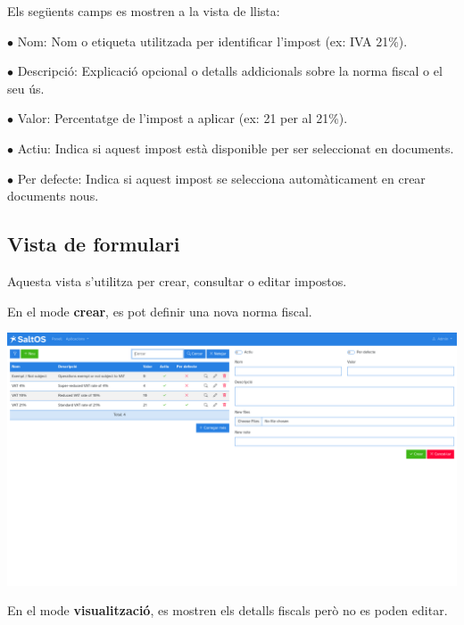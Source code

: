 \documentclass[a4paper]{article}
\begin{document}
Els següents camps es mostren a la vista de llista:

\begin{compactitem}
\item[\color{myblue}$\bullet$] Nom: Nom o etiqueta utilitzada per identificar l'impost (ex: IVA 21\%).
\item[\color{myblue}$\bullet$] Descripció: Explicació opcional o detalls addicionals sobre la norma fiscal o el seu ús.
\item[\color{myblue}$\bullet$] Valor: Percentatge de l'impost a aplicar (ex: 21 per al 21\%).
\item[\color{myblue}$\bullet$] Actiu: Indica si aquest impost està disponible per ser seleccionat en documents.
\item[\color{myblue}$\bullet$] Per defecte: Indica si aquest impost se selecciona automàticament en crear documents nous.
\end{compactitem}

\hypertarget{toc169}{}
\subsection{Vista de formulari}

Aquesta vista s'utilitza per crear, consultar o editar impostos.

En el mode \textbf{crear}, es pot definir una nova norma fiscal.

\begin{center}\includegraphics[width=1\textwidth]{../ujest/snaps/test-screenshots-js-screenshots-sales-taxes-create-ca-es-1-snap.png}\end{center}

En el mode \textbf{visualització}, es mostren els detalls fiscals però no es poden editar.
\end{document}
